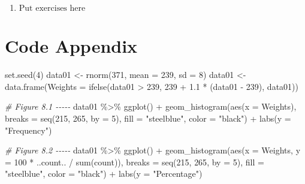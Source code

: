 \documentclass[
]{book}
\newenvironment{Shaded}{\begin{snugshade}}{\end{snugshade}}
\newcommand{\AttributeTok}[1]{\textcolor[rgb]{0.77,0.63,0.00}{#1}}
\newcommand{\CommentTok}[1]{\textcolor[rgb]{0.56,0.35,0.01}{\textit{#1}}}
\newcommand{\DecValTok}[1]{\textcolor[rgb]{0.00,0.00,0.81}{#1}}
\newcommand{\FloatTok}[1]{\textcolor[rgb]{0.00,0.00,0.81}{#1}}
\newcommand{\FunctionTok}[1]{\textcolor[rgb]{0.00,0.00,0.00}{#1}}
\newcommand{\NormalTok}[1]{#1}
\newcommand{\OtherTok}[1]{\textcolor[rgb]{0.56,0.35,0.01}{#1}}
\newcommand{\SpecialCharTok}[1]{\textcolor[rgb]{0.00,0.00,0.00}{#1}}
\newcommand{\StringTok}[1]{\textcolor[rgb]{0.31,0.60,0.02}{#1}}
\providecommand{\tightlist}{%
  \setlength{\itemsep}{0pt}\setlength{\parskip}{0pt}}
\begin{document}
\begin{enumerate}
\def\labelenumi{\arabic{enumi}.}
\tightlist
\item
  \(\text{Put exercises here}\)
\end{enumerate}

\hypertarget{code-appendix-1}{%
\section{Code Appendix}\label{code-appendix-1}}

\begin{Shaded}
\begin{Highlighting}[]
\FunctionTok{set.seed}\NormalTok{(}\DecValTok{4}\NormalTok{)}
\NormalTok{data01 }\OtherTok{\textless{}{-}} \FunctionTok{rnorm}\NormalTok{(}\DecValTok{371}\NormalTok{, }\AttributeTok{mean =} \DecValTok{239}\NormalTok{, }\AttributeTok{sd =} \DecValTok{8}\NormalTok{)}
\NormalTok{data01 }\OtherTok{\textless{}{-}} \FunctionTok{data.frame}\NormalTok{(}\AttributeTok{Weights =} \FunctionTok{ifelse}\NormalTok{(data01 }\SpecialCharTok{\textgreater{}} \DecValTok{239}\NormalTok{, }\DecValTok{239} \SpecialCharTok{+} \FloatTok{1.1} \SpecialCharTok{*}\NormalTok{ (data01 }\SpecialCharTok{{-}} \DecValTok{239}\NormalTok{), data01))}

\CommentTok{\# Figure 8.1 {-}{-}{-}{-}{-}}
\NormalTok{data01 }\SpecialCharTok{\%\textgreater{}\%} \FunctionTok{ggplot}\NormalTok{() }\SpecialCharTok{+} 
  \FunctionTok{geom\_histogram}\NormalTok{(}\FunctionTok{aes}\NormalTok{(}\AttributeTok{x =}\NormalTok{ Weights), }\AttributeTok{breaks =} \FunctionTok{seq}\NormalTok{(}\DecValTok{215}\NormalTok{, }\DecValTok{265}\NormalTok{, }\AttributeTok{by =} \DecValTok{5}\NormalTok{), }
                 \AttributeTok{fill =} \StringTok{"steelblue"}\NormalTok{, }\AttributeTok{color =} \StringTok{"black"}\NormalTok{) }\SpecialCharTok{+} 
  \FunctionTok{labs}\NormalTok{(}\AttributeTok{y =} \StringTok{"Frequency"}\NormalTok{)}

\CommentTok{\# Figure 8.2 {-}{-}{-}{-}{-}}
\NormalTok{data01 }\SpecialCharTok{\%\textgreater{}\%} \FunctionTok{ggplot}\NormalTok{() }\SpecialCharTok{+} 
  \FunctionTok{geom\_histogram}\NormalTok{(}\FunctionTok{aes}\NormalTok{(}\AttributeTok{x =}\NormalTok{ Weights, }\AttributeTok{y =} \DecValTok{100} \SpecialCharTok{*}\NormalTok{ ..count.. }\SpecialCharTok{/} \FunctionTok{sum}\NormalTok{(count)), }
                 \AttributeTok{breaks =} \FunctionTok{seq}\NormalTok{(}\DecValTok{215}\NormalTok{, }\DecValTok{265}\NormalTok{, }\AttributeTok{by =} \DecValTok{5}\NormalTok{), }
                 \AttributeTok{fill =} \StringTok{"steelblue"}\NormalTok{, }\AttributeTok{color =} \StringTok{"black"}\NormalTok{) }\SpecialCharTok{+} 
  \FunctionTok{labs}\NormalTok{(}\AttributeTok{y =} \StringTok{"Percentage"}\NormalTok{)}


\end{Highlighting}
\end{Shaded}
\end{document}
